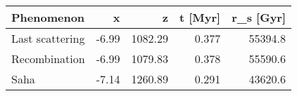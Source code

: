 \begin{tabular}{l|rrrr}
\hline
Phenomenon & x & z & t [Myr] & r_s [Gyr] \\
\hline
Last scattering   & -6.99 & 1082.29 & 0.377 & 55394.8 \\
Recombination     & -6.99 & 1079.83 & 0.378 & 55590.6 \\
Saha              & -7.14 & 1260.89 & 0.291 & 43620.6 \\
\hline
\hline
\end{tabular}
